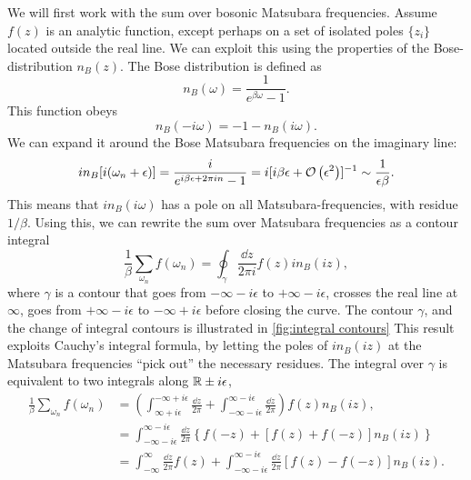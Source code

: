 We will first work with the sum over bosonic Matsubara frequencies.
Assume $f(z)$ is an analytic function, except perhaps on a set of isolated poles $\{z_i\}$ located outside the real line.
We can exploit this using the properties of the Bose-distribution $n_B(z)$.
The Bose distribution is defined as 
\begin{equation}
    n_B(\omega) = \frac{1}{e^{\beta \omega} - 1}.
\end{equation}
This function obeys
\begin{equation}
    n_B(- i \omega) = -1 - n_B(i \omega).
\end{equation}
We can expand it around the Bose Matsubara frequencies on the imaginary line:
\begin{equation}
    i n_B[i (\omega_n + \epsilon)] = \frac{i}{e^{i\beta \epsilon + 2 \pi i n} - 1}
    = i [i\beta \epsilon + \mathcal{O}\left(\epsilon^{2}\right) ]^{-1} \sim  \frac{1}{\epsilon \beta}.
\end{equation}
This means that $in_B(i\omega)$ has a pole on all Matsubara-frequencies, with residue $1/\beta$.
Using this, we can rewrite the sum over Matsubara frequencies as a contour integral
\begin{equation*}
    \frac{1}{\beta} \sum_{\omega_n} f(\omega_n) 
    = \oint_\gamma \frac{\dd z}{2 \pi i} f(z) i n_B(i z),
\end{equation*}
where $\gamma$ is a contour that goes from $- \infty - i \epsilon$ to $+ \infty - i \epsilon$, crosses the real line at $\infty$, goes from $+ \infty - i \epsilon$ to $- \infty + i \epsilon$ before closing the curve.
The contour $\gamma$, and the change of integral contours is illustrated in \autoref{fig:integral contours}
This result exploits Cauchy's integral formula, by letting the poles of $in_B(iz)$ at the Matsubara frequencies ``pick out'' the necessary residues.
The integral over $\gamma$ is equivalent to two integrals along $\mathbb{R} \pm i \epsilon$,
\begin{align}
    \nonumber
    \frac{1}{\beta} \sum_{\omega_n} f(\omega_n) 
    &= \left(
        \int_{\infty + i \epsilon}^{-\infty + i \epsilon} \frac{\dd z}{2 \pi} 
        + \int_{-\infty - i \epsilon}^{\infty - i \epsilon}\frac{\dd z}{2 \pi}
    \right) 
    f(z) n_B(i z),
    \\
    \nonumber
    & = \int_{-\infty - i \epsilon}^{\infty - i \epsilon}\frac{\dd z}{2 \pi}
    \left\{
        f(-z) + \left[f(z) + f(-z)\right] n_B(iz)
    \right\} 
    \\
    \label{bosonic sum to integral}
    & = \int_{-\infty}^{\infty} \frac{\dd z}{2 \pi} f(z)
    +
    \int_{-\infty - i \epsilon}^{\infty - i \epsilon}\frac{\dd z}{2 \pi}
    \left[
        f(z) - f(-z)
    \right]
    n_B(iz).
\end{align}

